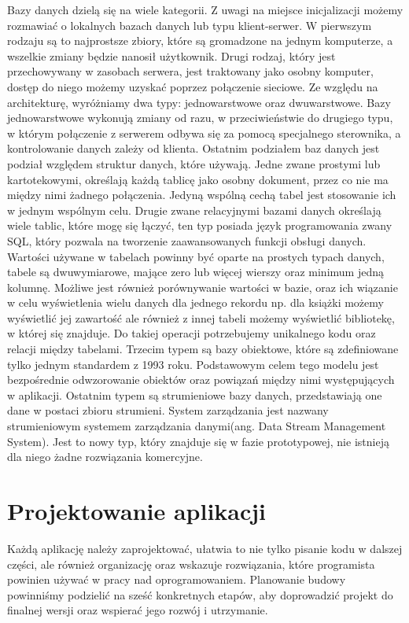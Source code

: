 Bazy danych dzielą się na wiele kategorii. Z uwagi na miejsce inicjalizacji możemy rozmawiać o lokalnych bazach danych lub typu klient-serwer. W pierwszym rodzaju są to najprostsze zbiory, które są gromadzone na jednym komputerze, a wszelkie zmiany będzie nanosił użytkownik. Drugi rodzaj, który jest przechowywany w zasobach serwera, jest traktowany jako osobny komputer, dostęp do niego możemy uzyskać poprzez połączenie sieciowe. Ze względu na architekturę, wyróżniamy dwa typy: jednowarstwowe oraz dwuwarstwowe. Bazy jednowarstwowe wykonują zmiany od razu, w przeciwieństwie do drugiego typu, w którym połączenie z serwerem odbywa się za pomocą specjalnego sterownika, a kontrolowanie danych zależy od klienta. Ostatnim podziałem baz danych jest podział względem struktur danych, które używają. Jedne zwane prostymi lub kartotekowymi, określają każdą tablicę jako osobny dokument, przez co nie ma między nimi żadnego połączenia. Jedyną wspólną cechą tabel jest stosowanie ich w jednym wspólnym celu. Drugie zwane relacyjnymi bazami danych określają wiele tablic, które mogę się łączyć, ten typ posiada język programowania zwany SQL, który pozwala na tworzenie zaawansowanych funkcji obsługi danych. Wartości używane w tabelach powinny być oparte na prostych typach danych, tabele są dwuwymiarowe, mające zero lub więcej wierszy oraz minimum jedną kolumnę. Możliwe jest również porównywanie wartości w bazie, oraz ich wiązanie w celu wyświetlenia wielu danych dla jednego rekordu np. dla książki możemy wyświetlić jej zawartość ale również z innej tabeli możemy wyświetlić bibliotekę, w której się znajduje. Do takiej operacji potrzebujemy unikalnego kodu oraz relacji między tabelami. Trzecim typem są bazy obiektowe, które są zdefiniowane tylko jednym standardem z 1993 roku. Podstawowym celem tego modelu jest bezpośrednie odwzorowanie obiektów oraz powiązań między nimi występujących w aplikacji. Ostatnim typem są strumieniowe bazy danych, przedstawiają one dane w postaci zbioru strumieni. System zarządzania jest nazwany strumieniowym systemem zarządzania danymi(ang. Data Stream Management System). Jest to nowy typ, który znajduje się w fazie prototypowej, nie istnieją dla niego żadne rozwiązania komercyjne. 
	
\section{Projektowanie aplikacji}

Każdą aplikację należy zaprojektować, ułatwia to nie tylko pisanie kodu w dalszej części, ale również organizację oraz wskazuje rozwiązania, które programista powinien używać w pracy nad oprogramowaniem. Planowanie budowy powinniśmy podzielić na sześć konkretnych etapów, aby doprowadzić projekt do finalnej wersji oraz wspierać jego rozwój i utrzymanie. 

